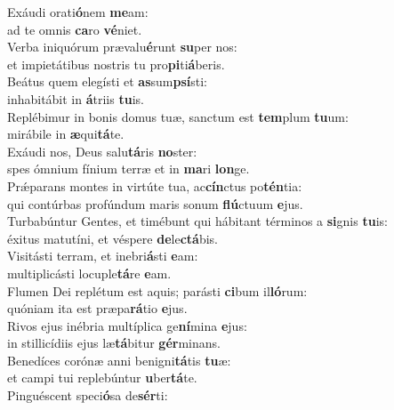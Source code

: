 \evenverse Exáudi orati\textbf{ó}nem \textbf{me}am:~\*\\
\evenverse ad te omnis \textbf{ca}ro \textbf{vé}niet.\\
\oddverse Verba iniquórum prævalu\textbf{é}runt \textbf{su}per nos:~\*\\
\oddverse et impietátibus nostris tu pro\textbf{pi}ti\textbf{á}beris.\\
\evenverse Beátus quem elegísti et \textbf{as}sum\textbf{psí}sti:~\*\\
\evenverse inhabitábit in \textbf{á}triis \textbf{tu}is.\\
\oddverse Replébimur in bonis domus tuæ, sanctum est \textbf{tem}plum \textbf{tu}um:~\*\\
\oddverse mirábile in \textbf{æ}qui\textbf{tá}te.\\
\evenverse Exáudi nos, Deus salu\textbf{tá}ris \textbf{no}ster:~\*\\
\evenverse spes ómnium fínium terræ et in \textbf{ma}ri \textbf{lon}ge.\\
\oddverse Prǽparans montes in virtúte tua, ac\textbf{cín}ctus po\textbf{tén}tia:~\*\\
\oddverse qui contúrbas profúndum maris sonum \textbf{flú}ctuum \textbf{e}jus.\\
\evenverse Turbabúntur Gentes, et timébunt qui hábitant términos a \textbf{si}gnis \textbf{tu}is:~\*\\
\evenverse éxitus matutíni, et véspere \textbf{de}le\textbf{ctá}bis.\\
\oddverse Visitásti terram, et inebri\textbf{á}sti \textbf{e}am:~\*\\
\oddverse multiplicásti locuple\textbf{tá}re \textbf{e}am.\\
\evenverse Flumen Dei replétum est aquis; parásti \textbf{ci}bum il\textbf{ló}rum:~\*\\
\evenverse quóniam ita est præpa\textbf{rá}tio \textbf{e}jus.\\
\oddverse Rivos ejus inébria multíplica ge\textbf{ní}mina \textbf{e}jus:~\*\\
\oddverse in stillicídiis ejus læ\textbf{tá}bitur \textbf{gér}minans.\\
\evenverse Benedíces corónæ anni benigni\textbf{tá}tis \textbf{tu}æ:~\*\\
\evenverse et campi tui replebúntur \textbf{u}ber\textbf{tá}te.\\
\oddverse Pinguéscent speci\textbf{ó}sa de\textbf{sér}ti:~\*\\
